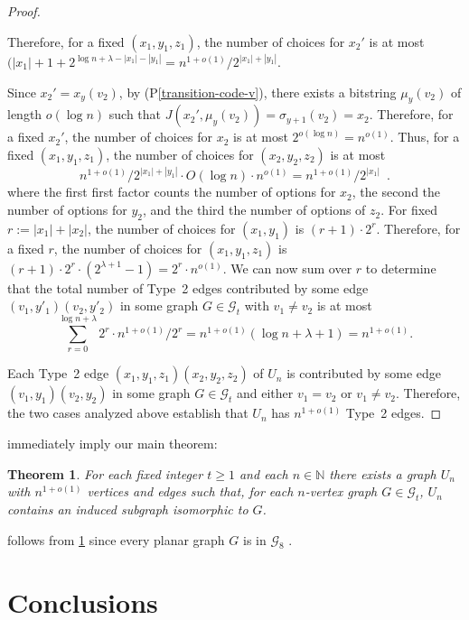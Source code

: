 \documentclass{patmorin}
\newcommand{\pref}[1]{(P\ref{#1})}
\newcommand{\N}{\mathbb{N}}
\newtheorem{theorem}{Theorem}
\begin{document}
\begin{proof}
\begin{enumerate}
        Therefore, for a fixed $(x_1,y_1,z_1)$, the number of choices for $x_2'$ is at most $(|x_1|+1+2^{\log n + \lambda - |x_1| - |y_1|}=n^{1+o(1)}/2^{|x_1|+|y_1|}$.

        Since $x_2'=x_y(v_2)$, by \pref{transition-code-v}, there exists a bitstring $\mu_y(v_2)$ of length $o(\log n)$ such that $J(x_2',\mu_y(v_2))=\sigma_{y+1}(v_2)=x_2$.  Therefore, for a fixed $x_2'$, the number of choices for $x_2$ is at most $2^{o(\log n)}=n^{o(1)}$.  Thus, for a fixed $(x_1,y_1,z_1)$, the number of choices for $(x_2,y_2,z_2)$ is at most
        \[
            n^{1+o(1)}/2^{|x_1|+|y_1|} \cdot O(\log n) \cdot n^{o(1)} = n^{1+o(1)}/2^{|x_1|} \enspace .
        \]
        where the first first factor counts the number of options for $x_2$, the second the number of options for $y_2$, and the third the number of options of $z_2$.  For fixed $r:=|x_1|+|x_2|$, the number of choices for $(x_1,y_1)$ is $(r+1)\cdot 2^{r}$.  Therefore, for a fixed $r$, the number of choices for $(x_1,y_1,z_1)$ is $(r+1)\cdot 2^r \cdot(2^{\lambda+1}-1)=2^r\cdot n^{o(1)}$.  We can now sum over $r$ to determine that the total number of Type~2 edges contributed by some edge $(v_1,y'_1)(v_2,y'_2)$ in some graph $G\in \mathcal{G}_t$ with $v_1\neq v_2$ is at most
        \[
            \sum_{r=0}^{\log n+\lambda} 2^r\cdot n^{1+o(1)}/2^r = n^{1+o(1)}(\log n+\lambda+1) = n^{1+o(1)}.
        \]
    \end{enumerate}
    Each Type~2 edge $(x_1,y_1,z_1)(x_2,y_2,z_2)$ of $U_n$ is contributed by some edge $(v_1,y_1)(v_2,y_2)$ in some graph $G\in\mathcal{G}_t$ and either $v_1=v_2$ or $v_1\neq v_2$.  Therefore, the two cases analyzed above establish that $U_n$ has $n^{1+o(1)}$ Type~2 edges.
\end{proof}

 immediately imply our main theorem:

\begin{theorem}\label{main}
    For each fixed integer $t\ge 1$ and each $n\in \N$ there exists a graph $U_n$ with $n^{1+o(1)}$ vertices and edges such that, for each $n$-vertex graph $G\in \mathcal{G}_t$, $U_n$ contains an induced subgraph isomorphic to $G$.
\end{theorem}

 follows from \cref{main} since every planar graph $G$ is in $\mathcal{G}_8$ \cite[Theorem~36]{dujmovic.joret.ea:planar}.

\section{Conclusions}
\label{summary}
\end{document}
